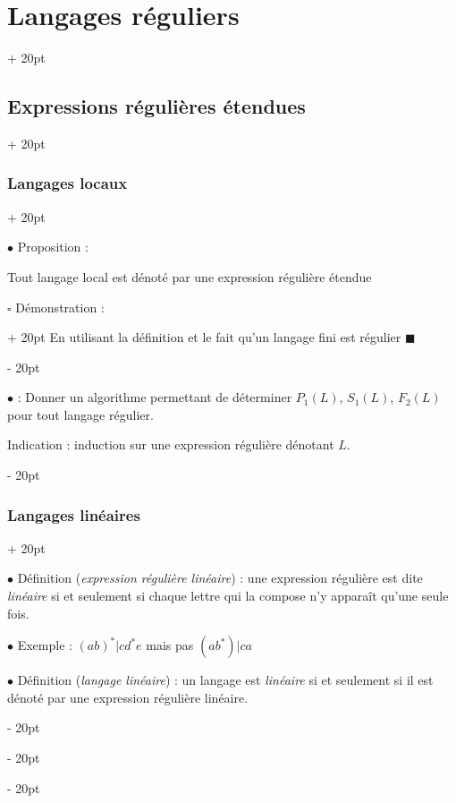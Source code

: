 \documentclass[a4paper, 12pt, twoside]{article}
\newcommand{\ind}[1][20pt]{\advance\leftskip + #1}
\newcommand{\deind}[1][20pt]{\advance\leftskip - #1}
\newenvironment{indt}[2][20pt]{#2 \par \ind[#1]}{\par \deind} %
\newenvironment{proof}[1][{Démonstration :}]{\begin{indt}{$\square$ #1}}{$\blacksquare$ \end{indt}}
\begin{document}
\begin{indt}{\section{Langages réguliers}}
\begin{indt}{\subsection{Expressions régulières étendues}}
\begin{indt}{\subsubsection{Langages locaux}}
                \vspace{12pt}
                
                $\bullet$ Proposition :
                \begin{emphBox}
                    Tout langage local est dénoté par une expression régulière étendue
                \end{emphBox}

                \vspace{6pt}
                
                \begin{proof}
                    En utilisant la définition et le fait qu'un langage fini est régulier 
                \end{proof}

                \vspace{12pt}
                
                $\bullet$  : Donner un algorithme permettant de déterminer $P_1(L)$, $S_1(L)$, $F_2(L)$ pour tout langage régulier.

                Indication : induction sur une expression régulière dénotant $L$.
            \end{indt}

            \vspace{12pt}
            
            \begin{indt}{\subsubsection{Langages linéaires}}
                \label{1.4.5}

                $\bullet$ Définition (\emph{expression régulière linéaire}) : une expression régulière est dite \emph{linéaire} si et seulement si chaque lettre qui la compose n'y apparaît qu'une seule fois.

                \vspace{12pt}
                
                $\bullet$ Exemple : $(ab)^* | cd^*e$ mais pas $(ab^*)|ca$

                \vspace{12pt}
                
                $\bullet$ Définition (\emph{langage linéaire}) : un langage est \emph{linéaire} si et seulement si il est dénoté par une expression régulière linéaire.


\end{indt}
\end{indt}
\end{indt}
\end{document}
